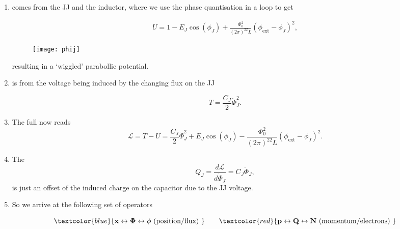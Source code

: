 \begin{enumerate}
\item {}  comes from  the JJ  and the
  inductor, where we use the phase quantisation in a loop to get

  {\begin{equation}
      \label{l3-energy1}
      \begin{aligned}
        U           =           1           -E_J\cos(\phi_J)           +
        \frac{\Phi_0^2}{(2\pi)^22L}(\phi_\text{ext}-\phi_J)^2,
      \end{aligned}
    \end{equation}}
  \begin{figure}[h]
    \centering \texttt{[image: phij]}
  \end{figure}

  \noindent
  \noindent resulting in a `wiggled' parabollic potential.

\item {} is from the voltage being
  induced by the changing flux on the JJ

  \begin{equation}\label{key}
    T = \frac{C_J}{2}\dot{\Phi}_J^2.
  \end{equation}

\item The full  now reads
  \begin{equation}\label{key}
    \mathcal{L} = T - U = \frac{C_J}{2}\dot{\Phi}_J^2 + E_J\cos(\phi_J) - \frac{\Phi_0^2}{(2\pi)^22L}(\phi_\text{ext}-\phi_J)^2.
  \end{equation}

\item The \textbf{}
  \begin{equation}\label{key}
    Q_J = \frac{d\mathcal{L}}{d\dot{\Phi}_J} = C_J\dot{\Phi}_J,
  \end{equation}
  \noindent is just an offset of the induced charge on the capacitor due
  to the JJ voltage.

\item So we arrive at the following set of operators

  \begin{equation}
    { \textcolor{blue}{\mathbf{x\leftrightarrow \Phi \leftrightarrow \phi} \text{ (position/flux) }}\qquad \textcolor{red}{\mathbf{p\leftrightarrow Q \leftrightarrow N \text{ (momentum/electrons) }}}}
  \end{equation}


\end{enumerate}
